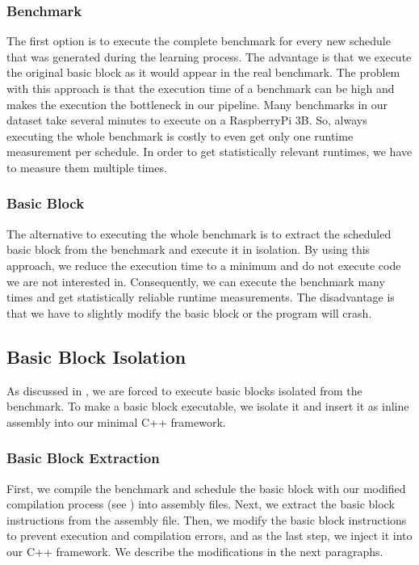 \subsubsection{Benchmark}
The first option is to execute the complete benchmark for every new schedule that was generated during the learning process.
The advantage is that we execute the original basic block as it would appear in the real benchmark.
The problem with this approach is that the execution time of a benchmark can be high and makes the execution the bottleneck in our pipeline.
Many benchmarks in our dataset take several minutes to execute on a RaspberryPi 3B.
So, always executing the whole benchmark is costly to even get only one runtime measurement per schedule.
In order to get statistically relevant runtimes, we have to measure them multiple times.

\subsubsection{Basic Block}
The alternative to executing the whole benchmark is to extract the scheduled basic block from the benchmark and execute it in isolation.
By using this approach, we reduce the execution time to a minimum and do not execute code we are not interested in.
Consequently, we can execute the benchmark many times and get statistically reliable runtime measurements.
The disadvantage is that we have to slightly modify the basic block or the program will crash.

\subsection{Basic Block Isolation}
\label{sec:approach:bbisolation}
As discussed in , we are forced to execute basic blocks isolated from the benchmark.
To make a basic block executable, we isolate it and insert it as inline assembly into our minimal C++ framework.

\subsubsection{Basic Block Extraction}
First, we compile the benchmark and schedule the basic block with our modified compilation process (see ) into assembly files.
Next, we extract the basic block instructions from the assembly file.
Then, we modify the basic block instructions to prevent execution and compilation errors, and as the last step, we inject it into our C++ framework.
We describe the modifications in the next paragraphs.


